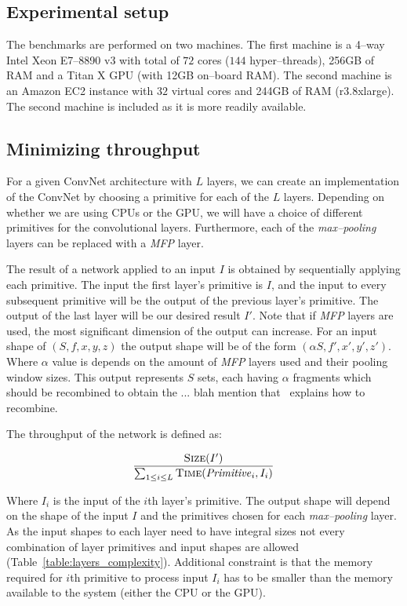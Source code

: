 \documentclass[conference]{./IEEEtran/IEEEtran}
\begin{document}
\subsection{Experimental setup}

  The benchmarks are performed on two machines.  The first machine is
  a 4--way Intel Xeon E7--8890 v3 with total of $72$ cores ($144$
  hyper--threads), 256GB of RAM and a Titan X GPU (with 12GB on--board
  RAM).  The second machine is an Amazon EC2 instance with $32$
  virtual cores and 244GB of RAM (r3.8xlarge).  The second machine is
  included as it is more readily available.

\subsection{Minimizing throughput}

  For a given ConvNet architecture with $L$ layers, we can create an
  implementation of the ConvNet by choosing a primitive for each of
  the $L$ layers.  Depending on whether we are using CPUs or the GPU,
  we will have a choice of different primitives for the convolutional
  layers.  Furthermore, each of the \emph{max--pooling} layers can be
  replaced with a \emph{MFP} layer.

  The result of a network applied to an input $I$ is obtained by
  sequentially applying each primitive.  The input the first layer's
  primitive is $I$, and the input to every subsequent primitive will
  be the output of the previous layer's primitive.  The output of the
  last layer will be our desired result $I'$.  Note that if \emph{MFP}
  layers are used, the most significant dimension of the output can
  increase.  For an input shape of $(S,f,x,y,z)$ the output shape will
  be of the form $(\alpha S,f',x',y',z')$.  Where $\alpha$ value is
  depends on the amount of \emph{MFP} layers used and their pooling
  window sizes.  This output represents $S$ sets, each having $\alpha$
  fragments which should be recombined to obtain the ... blah mention
  that~\cite{giusti2013fast,masci2013fast} explains how to recombine.

  The throughput of the network is defined as:

  $$\frac{\proc{Size}(I')}{\sum_{1 \le i \le L}
    \proc{Time}(\id{Primitive}_i,I_i)}$$

  Where $I_i$ is the input of the $i$th layer's primitive.  The output
  shape will depend on the shape of the input $I$ and the primitives
  chosen for each \emph{max--pooling} layer.  As the input shapes to
  each layer need to have integral sizes not every combination of
  layer primitives and input shapes are allowed
  (Table~\ref{table:layers_complexity}).  Additional constraint is
  that the memory required for $i$th primitive to process input $I_i$
  has to be smaller than the memory available to the system (either
  the CPU or the GPU).
\end{document}
